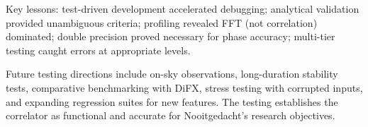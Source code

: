 Key lessons: test-driven development accelerated debugging; analytical validation provided unambiguous criteria; profiling revealed FFT (not correlation) dominated; double precision proved necessary for phase accuracy; multi-tier testing caught errors at appropriate levels.

Future testing directions include on-sky observations, long-duration stability tests, comparative benchmarking with DiFX, stress testing with corrupted inputs, and expanding regression suites for new features. The testing establishes the correlator as functional and accurate for Nooitgedacht's research objectives.
